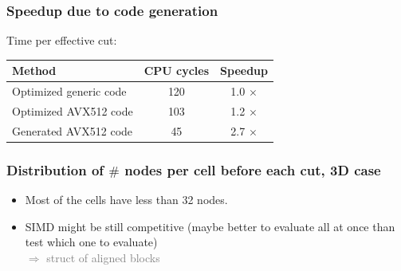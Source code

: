 \documentclass[aspectratio=169]{beamer}
\begin{document}
\begin{frame}
    \frametitle{Speedup due to code generation}

    Time per effective cut:

    \medskip
    \begin{center}    
    \begin{tabular}{|l|c|c|}
        \hline
        Method                 & CPU cycles & Speedup    \\
        \hline
        Optimized generic code & 120        & 1.0 $\times$ \\
        Optimized AVX512 code  & 103        & 1.2 $\times$ \\
        Generated AVX512 code  & 45         & 2.7 $\times$ \\
        \hline
    \end{tabular}
    \end{center}
\end{frame}


\begin{frame}
    \frametitle{Distribution of $\#$ nodes per cell before each cut, 3D case}

    \begin{minipage}[c][0.6\textheight][c]{0.4\textwidth}
        
    \end{minipage}
    \textwidth
    \begin{minipage}{0.55\textwidth}
        \begin{itemize}
            \item Most of the cells have less than 32 nodes.
            
            \bigskip
            \item SIMD might be still competitive (maybe better to evaluate all at once than test which one
            to evaluate)
                \\ \hfill {\textcolor{gray}{$\Rightarrow$ struct of aligned blocks}}
        \end{itemize}
    \end{minipage}
\end{frame}
\end{document}
